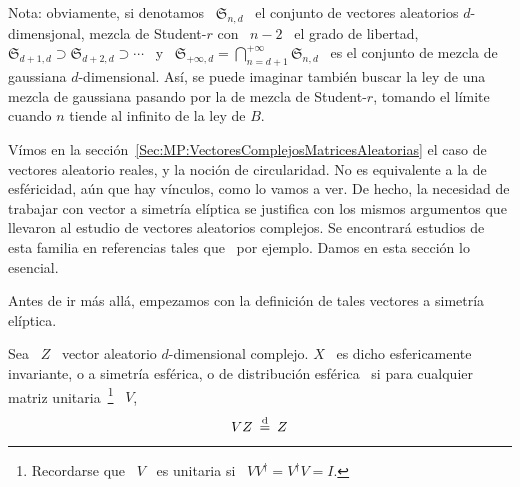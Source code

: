 Nota: obviamente, si denotamos \  $\mathfrak{S}_{n,d}$ \ el conjunto de vectores
aleatorios  $d$-dimensjonal, mezcla de  Student-$r$ con  \ $n-2$  \ el  grado de
libertad, $\mathfrak{S}_{d+1,d} \supset \mathfrak{S}_{d+2,d} \supset \cdots$ \ y
\    $\displaystyle    \mathfrak{S}_{+\infty,d}   =    \bigcap_{n=d+1}^{+\infty}
\mathfrak{S}_{n,d}$    \   es    el    conjunto   de    mezcla   de    gaussiana
$d$-dimensional. As\'i, se puede imaginar  tambi\'en buscar la ley de una mezcla
de gaussiana pasando por la de mezcla de Student-$r$, tomando el l\'imite cuando
$n$ tiende al infinito de la ley de $B$.



\label{Ssec:MP:FamiliaElipticaCompleja}


V\'imos en la secci\'on~\ref{Sec:MP:VectoresComplejosMatricesAleatorias} el caso
de vectores aleatorio reales, y la noci\'on de circularidad. No es equivalente a
la de esf\'ericidad, a\'un que hay v\'inculos, como lo vamos a ver. De hecho, la
necesidad de  trabajar con vector a  simetr\'ia el\'iptica se  justifica con los
mismos argumentos que  llevaron al estudio de vectores  aleatorios complejos. Se
encontrar\'a  estudios de  esta  familia en  referencias tales  que~\cite{Kri76,
  KriLin86,   MicDey06,  OllEri11,   OllTyl12,  FanKot90,   BesAbr13,  BauPas07,
  ChiPas08} por ejemplo. Damos en esta secci\'on lo esencial.

Antes de  ir m\'as  all\'a, empezamos  con la definici\'on  de tales  vectores a
simetr\'ia el\'iptica.
%
\begin{definicion}
  Sea  \  $Z$ \  vector  aleatorio $d$-dimensional  complejo.   $X$  \ es  dicho
  esfericamente  invariante,  o a  simetr\'ia  esf\'erica,  o de  distribuci\'on
  esf\'erica \ si para  cualquier matriz unitaria~\footnote{Recordarse que \ $V$
    \ es unitaria si \ $V V^\dag = V^\dag V = I$.} \ $V$,
  \[
  V  Z  \: \stackrel{\mathrm{d}}{=}  \: Z
  \]
\end{definicion}

